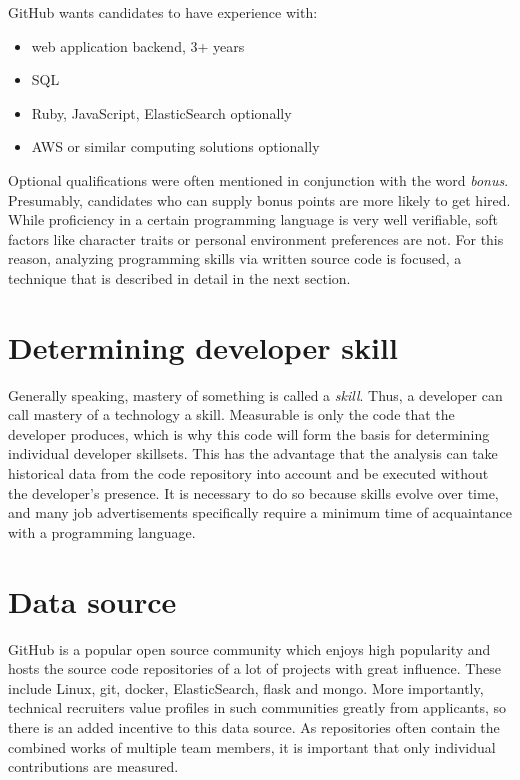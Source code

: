 GitHub wants candidates to have experience with:
\begin{itemize}
    \item web application backend, 3+ years
    \item SQL
    \item Ruby, JavaScript, ElasticSearch optionally
    \item AWS or similar computing solutions optionally
\end{itemize}

Optional qualifications were often mentioned in conjunction with the word \textit{bonus}. Presumably, candidates who can supply bonus points are more likely to get hired. While proficiency in a certain programming language is very well verifiable, soft factors like character traits or personal environment preferences are not. For this reason, analyzing programming skills via written source code is focused, a technique that is described in detail in the next section.

\section{Determining developer skill}
Generally speaking, mastery of something is called a \textit{skill}. Thus, a developer can call mastery of a technology a skill. Measurable is only the code that the developer produces, which is why this code will form the basis for determining individual developer skillsets. This has the advantage that the analysis can take historical data from the code repository into account and be executed without the developer's presence. It is necessary to do so because skills evolve over time, and many job advertisements specifically require a minimum time of acquaintance with a programming language.

\section{Data source}\label{sec:data-source}
GitHub is a popular open source community which enjoys high popularity
and hosts the source code repositories of a lot of projects with great influence. These include Linux, git, docker, ElasticSearch, flask and mongo\cite{rpfd:2014}. More importantly, technical recruiters value profiles in such communities greatly from applicants\cite{md:2013}, so there is an added incentive to this data source. As repositories often contain the combined works of multiple team members, it is important that only individual contributions are measured.

